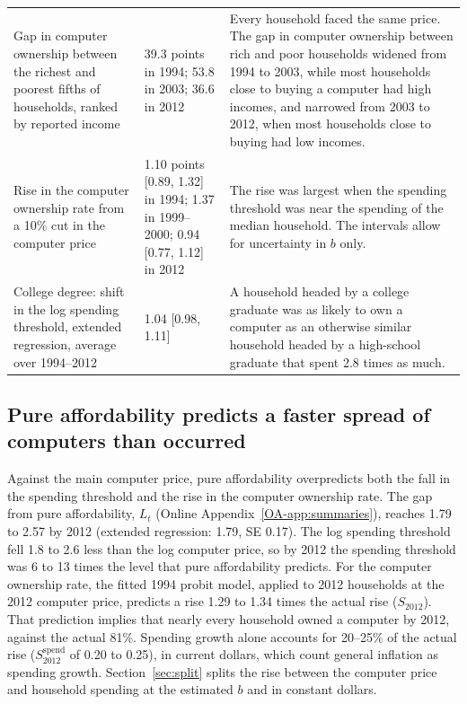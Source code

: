 \documentclass[11pt]{article}
\begin{document}
\begin{table}[!htb]
\begin{tabular}{L{0.27\textwidth}L{0.25\textwidth}L{0.4\textwidth}}
\addlinespace
Gap in computer ownership between the richest and poorest fifths of households, ranked by reported income & 39.3 points in 1994; 53.8 in 2003; 36.6 in 2012 & Every household faced the same price. The gap in computer ownership between rich and poor households widened from 1994 to 2003, while most households close to buying a computer had high incomes, and narrowed from 2003 to 2012, when most households close to buying had low incomes. \\
\addlinespace
Rise in the computer ownership rate from a 10\% cut in the computer price & 1.10 points [0.89, 1.32] in 1994; 1.37 in 1999--2000; 0.94 [0.77, 1.12] in 2012 & The rise was largest when the spending threshold was near the spending of the median household. The intervals allow for uncertainty in $b$ only. \\
\addlinespace
College degree: shift in the log spending threshold, extended regression, average over 1994--2012 & 1.04 [0.98, 1.11] & A household headed by a college graduate was as likely to own a computer as an otherwise similar household headed by a high-school graduate that spent 2.8 times as much. \\
\bottomrule
\end{tabular}
\end{table}

\subsection{Pure affordability predicts a faster spread of computers than occurred}
\label{app:pure}

Against the main computer price, pure affordability overpredicts both the fall in the spending threshold and the rise in the computer ownership rate. The gap from pure affordability, $L_t$ (Online Appendix~\ref{OA-app:summaries}), reaches 1.79 to 2.57 by 2012 (extended regression: 1.79, SE 0.17). The log spending threshold fell 1.8 to 2.6 less than the log computer price, so by 2012 the spending threshold was 6 to 13 times the level that pure affordability predicts. For the computer ownership rate, the fitted 1994 probit model, applied to 2012 households at the 2012 computer price, predicts a rise 1.29 to 1.34 times the actual rise ($S_{2012}$). That prediction implies that nearly every household owned a computer by 2012, against the actual 81\%. Spending growth alone accounts for 20--25\% of the actual rise ($S^{\text{spend}}_{2012}$ of 0.20 to 0.25), in current dollars, which count general inflation as spending growth. Section~\ref{sec:split} splits the rise between the computer price and household spending at the estimated $b$ and in constant dollars.
\end{document}
